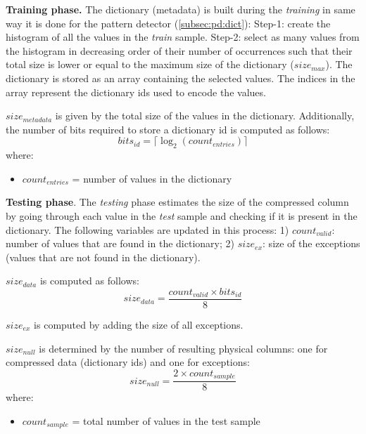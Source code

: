 \textbf{Training phase.} The dictionary (metadata) is built during the \textit{training} in same way it is done for the  pattern detector (\ref{subsec:pd:dict}): Step-1: create the histogram of all the values in the \textit{train} sample. Step-2: select as many values from the histogram in decreasing order of their number of occurrences such that their total size is lower or equal to the maximum size of the dictionary (\(size_{max}\)). The dictionary is stored as an array containing the selected values. The indices in the array represent the dictionary ids used to encode the values.

\(size_{metadata}\) is given by the total size of the values in the dictionary. Additionally, the number of bits required to store a dictionary id is computed as follows:
\begin{equation}
\label{eq:estimators:dict:bitsid}
bits_{id} = \lceil \log_2 (count_{entries}) \rceil
\end{equation}
where:
\begin{itemize}
    \item[] \(count_{entries}\) = number of values in the dictionary
\end{itemize}

\textbf{Testing phase}. The \textit{testing} phase estimates the size of the compressed column by going through each value in the \textit{test} sample and checking if it is present in the dictionary. The following variables are updated in this process: 1) \(count_{valid}\): number of values that are found in the dictionary; 2) \(size_{ex}\): size of the exceptions (values that are not found in the dictionary).

\(size_{data}\) is computed as follows:
\begin{equation}
\label{eq:estimators:dict:sizedata}
size_{data} = \frac{count_{valid} \times bits_{id}}{8}
\end{equation}

\(size_{ex}\) is computed by adding the size of all exceptions.

\(size_{null}\) is determined by the number of resulting physical columns: one for compressed data (dictionary ids) and one for exceptions:
\begin{equation}
\label{eq:estimators:dict:sizenull}
size_{null} = \frac{2 \times count_{sample}}{8}
\end{equation}
where:
\begin{itemize}
    \item[] \(count_{sample}\) = total number of values in the test sample
\end{itemize}


